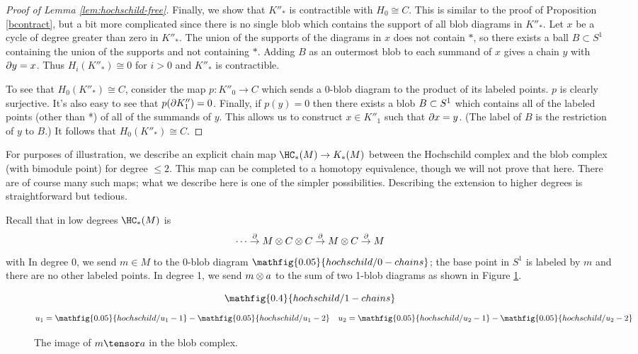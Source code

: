 \begin{proof}[Proof of Lemma \ref{lem:hochschild-free}]
Finally, we show that $K''_*$ is contractible with $H_0\cong C$.
This is similar to the proof of Proposition \ref{bcontract}, but a bit more
complicated since there is no single blob which contains the support of all blob diagrams
in $K''_*$.
Let $x$ be a cycle of degree greater than zero in $K''_*$.
The union of the supports of the diagrams in $x$ does not contain $*$, so there exists a
ball $B \subset S^1$ containing the union of the supports and not containing $*$.
Adding $B$ as an outermost blob to each summand of $x$ gives a chain $y$ with $\partial y = x$.
Thus $H_i(K''_*) \cong 0$ for $i> 0$ and $K''_*$ is contractible.

To see that $H_0(K''_*) \cong C$, consider the map $p: K''_0 \to C$ which sends a 0-blob
diagram to the product of its labeled points.
$p$ is clearly surjective.
It's also easy to see that $p(\partial K''_1) = 0$.
Finally, if $p(y) = 0$ then there exists a blob $B \subset S^1$ which contains
all of the labeled points (other than *) of all of the summands of $y$.
This allows us to construct $x\in K''_1$ such that $\partial x = y$.
(The label of $B$ is the restriction of $y$ to $B$.)
It follows that $H_0(K''_*) \cong C$.
\end{proof}

\medskip

For purposes of illustration, we describe an explicit chain map
$\HC_*(M) \to K_*(M)$
between the Hochschild complex and the blob complex (with bimodule point)
for degree $\le 2$.
This map can be completed to a homotopy equivalence, though we will not prove that here.
There are of course many such maps; what we describe here is one of the simpler possibilities.
Describing the extension to higher degrees is straightforward but tedious.

Recall that in low degrees $\HC_*(M)$ is
\[
	\cdots \stackrel{\partial}{\to} M \otimes C\otimes C \stackrel{\partial}{\to} 
			M \otimes C \stackrel{\partial}{\to} M
\]
with
In degree 0, we send $m\in M$ to the 0-blob diagram $\mathfig{0.05}{hochschild/0-chains}$; the base point
in $S^1$ is labeled by $m$ and there are no other labeled points.
In degree 1, we send $m\otimes a$ to the sum of two 1-blob diagrams
as shown in Figure \ref{fig:hochschild-1-chains}.

\begin{figure}[t]
\begin{equation*}
\mathfig{0.4}{hochschild/1-chains}
\end{equation*}
\begin{align*}
u_1 & = \mathfig{0.05}{hochschild/u_1-1} - \mathfig{0.05}{hochschild/u_1-2} & u_2 & = \mathfig{0.05}{hochschild/u_2-1} - \mathfig{0.05}{hochschild/u_2-2} 
\end{align*}
\caption{The image of $m \tensor a$ in the blob complex.}
\label{fig:hochschild-1-chains}
\end{figure}

